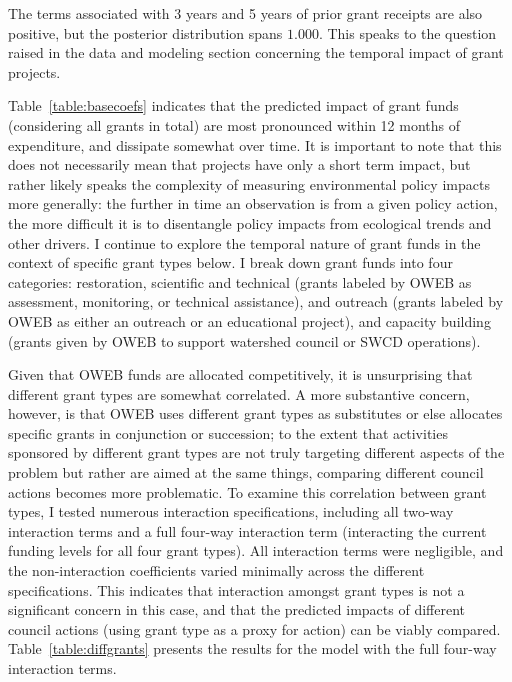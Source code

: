 \documentclass[12pt,a4paper,titlepage]{article}
\begin{document}
The terms associated with 3 years and 5 years of prior grant receipts are also positive, but the posterior distribution spans $1.000$. This speaks to the question raised in the data and modeling section concerning the temporal impact of grant projects. 

Table~\ref{table:basecoefs} indicates that the predicted impact of grant funds (considering all grants in total) are most pronounced within 12 months of expenditure, and dissipate somewhat over time. It is important to note that this does not necessarily mean that projects have only a short term impact, but rather likely speaks the complexity of measuring environmental policy impacts more generally: the further in time an observation is from a given policy action, the more difficult it is to disentangle policy impacts from ecological trends and other drivers. I continue to explore the temporal nature of grant funds in the context of specific grant types below. I break down grant funds into four categories: restoration, scientific and technical (grants labeled by OWEB as assessment, monitoring, or technical assistance), and outreach (grants labeled by OWEB as either an outreach or an educational project), and capacity building (grants given by OWEB to support watershed council or SWCD operations). 

Given that OWEB funds are allocated competitively, it is unsurprising that different grant types are somewhat correlated. A more substantive concern, however, is that OWEB uses different grant types as substitutes or else allocates specific grants in conjunction or succession; to the extent that activities sponsored by different grant types are not truly targeting different aspects of the problem but rather are aimed at the same things, comparing different council actions becomes more problematic. To examine this correlation between grant types, I tested numerous interaction specifications, including all two-way interaction terms and a full four-way interaction term (interacting the current funding levels for all four grant types). All interaction terms were negligible, and the non-interaction coefficients varied minimally across the different specifications. This indicates that interaction amongst grant types is not a significant concern in this case, and that the predicted impacts of different council actions (using grant type as a proxy for action) can be viably compared. Table~\ref{table:diffgrants} presents the results for the model with the full four-way interaction terms. 
\end{document}
